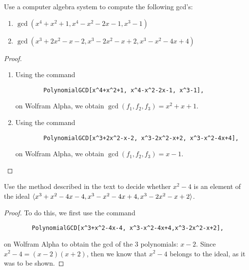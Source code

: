 \begin{exercise}{8}
Use a computer algebra system to compute the following gcd's:
\begin{enumerate}
    \item $\gcd(x^4+x^2+1, x^4-x^2-2x-1, x^3-1)$
    \item $\gcd(x^3+2x^2-x-2, x^3-2x^2-x+2, x^3-x^2-4x+4)$
\end{enumerate}
\end{exercise}
\begin{proof}
\begin{enumerate}
    \item Using the command 
    \begin{verbatim}
        PolynomialGCD[x^4+x^2+1, x^4-x^2-2x-1, x^3-1],
    \end{verbatim}
    on Wolfram Alpha, we obtain $\gcd(f_1, f_2, f_3)=x^2+x+1$.
    \item Using the command 
    \begin{verbatim}
        PolynomialGCD[x^3+2x^2-x-2, x^3-2x^2-x+2, x^3-x^2-4x+4],
    \end{verbatim}
    on Wolfram Alpha, we obtain $\gcd(f_1, f_2, f_3)=x-1$.
\end{enumerate}
\end{proof}

\begin{exercise}{9}
Use the method described in the text to decide whether $x^2-4$ is an element of the ideal $\langle x^3+x^2-4x-4, x^3-x^2-4x+4,x^3-2x^2-x+2\rangle$.
\end{exercise}
\begin{proof}
To do this, we first use the command 
\begin{verbatim}
        PolynomialGCD[x^3+x^2-4x-4, x^3-x^2-4x+4,x^3-2x^2-x+2],
\end{verbatim}
on Wolfram Alpha to obtain the gcd of the 3 polynomials: $x-2$. Since $x^2-4 = (x-2)(x+2)$, then we know that $x^2-4$ belongs to the ideal, as it was to be shown.
\end{proof}

